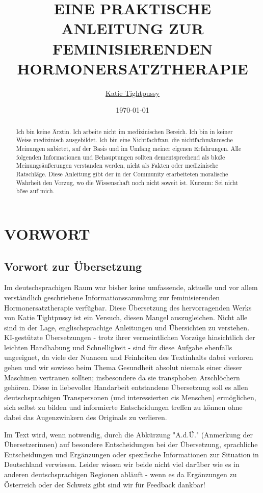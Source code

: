 \documentclass{article}
\title{EINE PRAKTISCHE ANLEITUNG ZUR FEMINISIERENDEN HORMONERSATZTHERAPIE}
\author{\href{https://katea.gay/}{Katie Tightpussy}}
\date{\today}
\begin{document}
\maketitle
\tableofcontents

\begin{abstract}
    Ich bin keine Ärztin. Ich arbeite nicht im medizinischen Bereich. Ich bin in keiner Weise medizinisch ausgebildet. Ich bin eine Nichtfachfrau, die nichtfachmännische Meinungen anbietet, auf der Basis und im Umfang meiner eigenen Erfahrungen. Alle folgenden Informationen und Behauptungen sollten dementsprechend als bloße Meinungsäußerungen verstanden werden, nicht als Fakten oder medizinische Ratschläge. Diese Anleitung gibt der in der Community erarbeiteten moralische Wahrheit den Vorzug, wo die Wissenschaft noch nicht soweit ist. Kurzum: Sei nicht böse auf mich. 
\end{abstract}


\section{VORWORT}

\subsection*{Vorwort zur Übersetzung}

Im deutschsprachigen Raum war bisher keine umfassende, aktuelle und vor allem verständlich geschriebene Informationssammlung zur feminisierenden Hormonersatztherapie verfügbar. Diese Übersetzung des hervorragenden Werks von Katie Tightpussy ist ein Versuch, diesen Mangel auszugleichen. Nicht alle sind in der Lage, englischsprachige Anleitungen und Übersichten zu verstehen. KI-gestützte Übersetzungen - trotz ihrer vermeintlichen Vorzüge hinsichtlich der leichten Handhabung und Schnelligkeit - sind für diese Aufgabe ebenfalls ungeeignet, da viele der Nuancen und Feinheiten des Textinhalts dabei verloren gehen und wir sowieso beim Thema Gesundheit absolut niemals einer dieser Maschinen vertrauen sollten; insbesondere da sie transphoben Arschlöchern gehören. Diese in liebevoller Handarbeit entstandene Übersetzung soll es allen deutschsprachigen Transpersonen (und  interessierten cis Menschen) ermöglichen, sich selbst zu bilden und informierte Entscheidungen treffen zu können ohne dabei das Augenzwinkern des Originals zu verlieren. 

Im Text wird, wenn notwendig, durch die Abkürzung "A.d.Ü." (Anmerkung der Übersetzerinnen) auf besondere Entscheidungen bei der Übersetzung, sprachliche Entscheidungen und Ergänzungen oder spezifische Informationen zur Situation in Deutschland verwiesen. Leider wissen wir beide nicht viel darüber wie es in anderen deutschsprachigen Regionen abläuft - wenn es da Ergänzungen zu Österreich oder der Schweiz gibt sind wir für Feedback dankbar!
\end{document}
